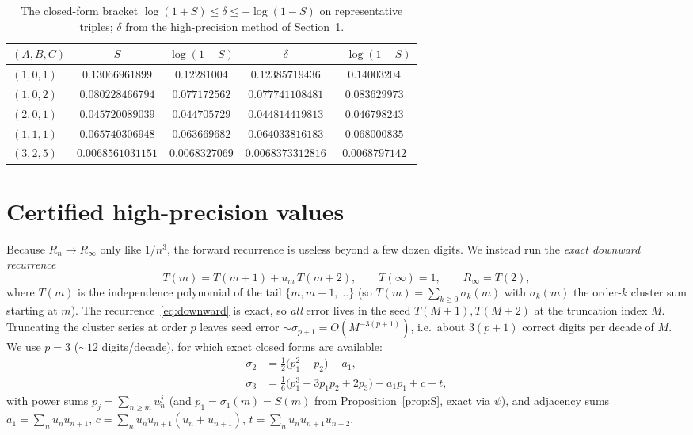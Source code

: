\documentclass[11pt]{article}
\newcommand{\Rinf}{R_\infty}
\begin{document}
\begin{table}[t]
\centering
\caption{The closed-form bracket $\log(1+S)\le\delta\le-\log(1-S)$ on
representative triples; $\delta$ from the high-precision method of
Section~\ref{sec:hp}.}\label{tab:bracket}
\begin{tabular}{lcccc}
\toprule
$(A,B,C)$ & $S$ & $\log(1+S)$ & $\delta$ & $-\log(1-S)$\\
\midrule
$(1,0,1)$ & $0.13066961899$ & $0.12281004$ & $0.12385719436$ & $0.14003204$\\
$(1,0,2)$ & $0.080228466794$ & $0.077172562$ & $0.077741108481$ & $0.083629973$\\
$(2,0,1)$ & $0.045720089039$ & $0.044705729$ & $0.044814419813$ & $0.046798243$\\
$(1,1,1)$ & $0.065740306948$ & $0.063669682$ & $0.064033816183$ & $0.068000835$\\
$(3,2,5)$ & $0.0068561031151$ & $0.0068327069$ & $0.0068373312816$ & $0.0068797142$\\
\bottomrule
\end{tabular}
\end{table}

\section{Certified high-precision values}\label{sec:hp}

Because $R_n\to\Rinf$ only like $1/n^3$, the forward recurrence is useless beyond a
few dozen digits. We instead run the \emph{exact downward recurrence}
\begin{equation}\label{eq:downward}
  T(m)=T(m+1)+u_m\,T(m+2),\qquad T(\infty)=1,\qquad \Rinf=T(2),
\end{equation}
where $T(m)$ is the independence polynomial of the tail $\{m,m+1,\dots\}$ (so
$T(m)=\sum_{k\ge0}\sigma_k(m)$ with $\sigma_k(m)$ the order-$k$ cluster sum starting
at $m$). The recurrence~\eqref{eq:downward} is exact, so \emph{all} error lives in
the seed $T(M+1),T(M+2)$ at the truncation index $M$. Truncating the cluster series
at order $p$ leaves seed error $\sim\sigma_{p+1}=O(M^{-3(p+1)})$, i.e.\ about
$3(p+1)$ correct digits per decade of $M$. We use $p=3$ ($\sim12$ digits/decade),
for which exact closed forms are available:
\begin{align}
  \sigma_2 &= \tfrac12\big(p_1^2-p_2\big)-a_1, \label{eq:sig2}\\
  \sigma_3 &= \tfrac16\big(p_1^3-3p_1p_2+2p_3\big)-a_1p_1+c+t, \label{eq:sig3}
\end{align}
with power sums $p_j=\sum_{n\ge m}u_n^j$ (and $p_1=\sigma_1(m)=S(m)$ from
Proposition~\ref{prop:S}, exact via $\psi$), and adjacency sums
$a_1=\sum_n u_nu_{n+1}$, $c=\sum_n u_nu_{n+1}(u_n+u_{n+1})$,
$t=\sum_n u_nu_{n+1}u_{n+2}$.
\end{document}

